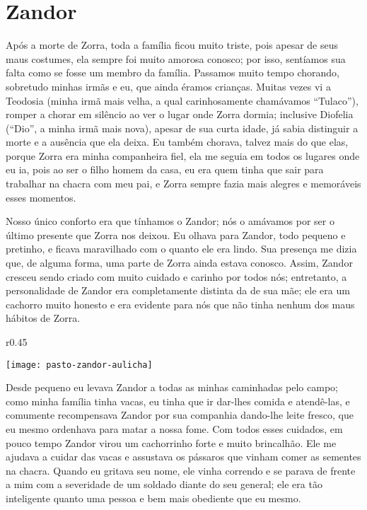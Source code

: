 \cleardoublepage
\newpage
\ifdefined\EnableIncludeImages
\fi
\chapter{Zandor}

Após a morte de Zorra, toda a família ficou muito triste, pois apesar de seus maus costumes, ela sempre foi muito amorosa conosco; por isso, sentíamos sua falta como se fosse um membro da família. 
Passamos muito tempo chorando, sobretudo minhas irmãs e eu, que ainda éramos crianças. 
Muitas vezes vi a Teodosia (minha irmã mais velha, a qual carinhosamente chamávamos ``Tulaco''), romper a chorar em silêncio ao ver o lugar onde Zorra dormia; inclusive Diofelia  (``Dio'', a minha irmã mais nova), apesar de sua curta idade, já sabia distinguir a morte e a ausência que ela deixa. 
Eu também chorava, talvez mais do que elas, porque Zorra era minha companheira fiel, ela me seguia em todos os lugares onde eu ia, pois ao ser o filho homem da casa, eu era quem tinha que sair para trabalhar na chacra com meu pai, e Zorra sempre fazia mais alegres e memoráveis esses momentos.

Nosso único conforto era que tínhamos o Zandor; nós o amávamos por ser o último presente que Zorra nos deixou.
Eu olhava para Zandor, todo pequeno e pretinho, e ficava maravilhado com o quanto ele era lindo. Sua presença me dizia que, de alguma forma, uma parte de Zorra ainda estava conosco. 
Assim, Zandor cresceu sendo criado com muito cuidado e carinho por todos nós;
entretanto, a personalidade de Zandor era completamente distinta da de sua mãe; ele era um cachorro muito honesto e era evidente para nós que não tinha nenhum dos maus hábitos de Zorra. 
\ifdefined\EnableIncludeImages
\begin{wrapfigure}{r}{0.45\textwidth}
  \begin{center}
  \vspace{-20pt}
    \texttt{[image: pasto-zandor-aulicha]}
  \end{center}
  \vspace{-20pt}
\end{wrapfigure}
\fi
Desde pequeno eu levava Zandor a todas as minhas caminhadas pelo campo; como minha família tinha vacas, eu tinha que ir dar-lhes comida e atendê-las, e comumente recompensava Zandor por sua companhia dando-lhe leite fresco, que eu mesmo ordenhava para matar a nossa fome. 
Com todos esses cuidados, em pouco tempo Zandor virou um cachorrinho forte e muito brincalhão.
Ele me ajudava a cuidar das vacas e assustava os pássaros que vinham comer as sementes na chacra. 
Quando eu gritava seu nome, ele vinha correndo e se parava de frente a mim com a severidade de um soldado diante do seu general; 
ele era tão inteligente quanto uma pessoa e bem mais obediente que eu mesmo.

